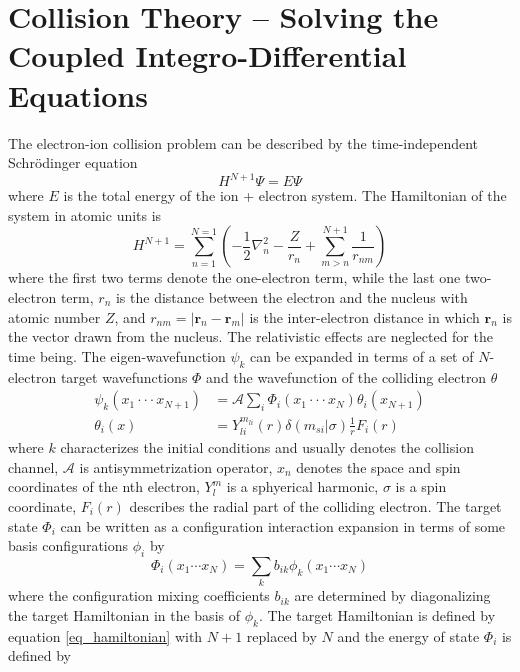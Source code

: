 \section{Collision Theory -- Solving the Coupled Integro-Differential Equations}
The electron-ion collision problem can be described by the time-independent Schr\"odinger equation
\begin{equation} \label{eq_schodinger}
	H^{N+1}\Psi = E\Psi
\end{equation}
where $E$ is the total energy of the ion + electron system. The Hamiltonian of the system in atomic units is 
\begin{equation} \label{eq_hamiltonian}
	H^{N+1} = \sum_{n=1}^{N=1} (-\frac{1}{2}\nabla_n^2-\frac{Z}{r_n}+\sum_{m>n}^{N+1}\frac{1}{r_{nm}})
\end{equation}
where the first two terms denote the one-electron term, while the last one two-electron term, $r_n$ is the distance between the electron and the nucleus with atomic number $Z$, and $r_{nm} = |\textbf{r}_n-\textbf{r}_m|$ is the  inter-electron distance in which $\textbf{r}_n$ is the vector drawn from the nucleus. The relativistic effects are neglected for the time being. The eigen-wavefunction $\psi_k$ can be expanded in terms of a set of $N$-electron target wavefunctions $\Phi$ and the wavefunction of the colliding electron $\theta$
\begin{align}
	\psi_k(x_1\cdot\cdot\cdot x_{N+1}) &= \mathcal{A}\sum_{i}\Phi_i(x_1\cdot\cdot\cdot x_{N})\theta_i(x_{N+1}) \label{wave_expand}\\
	\theta_i(x) &=Y_{li}^{m_{li}}(r)\delta(m_{si}|\sigma)\frac{1}{r}F_i(r)
\end{align}
where $k$ characterizes the initial conditions and usually denotes the collision channel, $\mathcal{A}$ is antisymmetrization operator, $x_n$ denotes the space and spin coordinates of the nth electron, $Y_l^m$ is a sphyerical harmonic, $\sigma$ is a spin coordinate, $F_i(r)$ describes the radial part of the colliding electron. The target state $\Phi_i$ can be written as a configuration interaction expansion in terms of some basis configurations $\phi_i$ by
\begin{equation} \label{eq_target_expand}
	\Phi_i(x_1\cdots x_N) = \sum_kb_{ik}\phi_k(x_1\cdots x_N)
\end{equation}
where the configuration mixing coefficients $b_{ik}$ are determined by diagonalizing the target Hamiltonian in the basis of $\phi_k$. The target Hamiltonian is defined by equation \ref{eq_hamiltonian} with $N+1$ replaced by $N$ and the energy of state $\Phi_i$ is defined by
